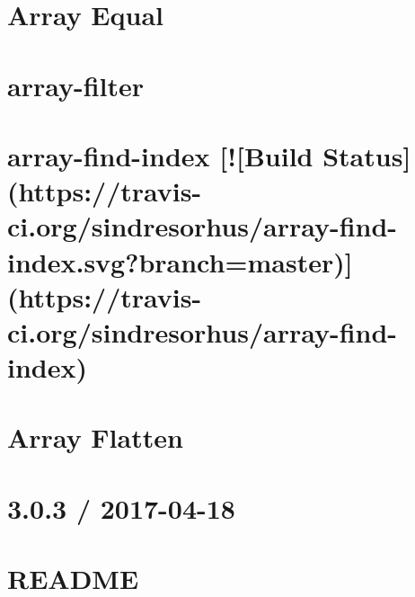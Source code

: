 \documentclass[twoside]{book}
\newcommand{\+}{\discretionary{\mbox{\scriptsize$\hookleftarrow$}}{}{}}
\begin{document}
\chapter{Array Equal}
\label{md__c_1_workspace_demo_src_main_script_node_modules_array-equal__r_e_a_d_m_e}

\chapter{array-\/filter}
\label{md__c_1_workspace_demo_src_main_script_node_modules_array-filter__r_e_a_d_m_e}

\chapter{array-\/find-\/index \mbox{[}!\mbox{[}Build Status\mbox{]}(https\+://travis-\/ci.org/sindresorhus/array-\/find-\/index.svg?branch=master)\mbox{]}(https\+://travis-\/ci.org/sindresorhus/array-\/find-\/index)}
\label{md__c_1_workspace_demo_src_main_script_node_modules_array-find-index_readme}

\chapter{Array Flatten}
\label{md__c_1_workspace_demo_src_main_script_node_modules_array-flatten__r_e_a_d_m_e}

\chapter{3.0.3 / 2017-\/04-\/18}
\label{md__c_1_workspace_demo_src_main_script_node_modules_array-includes__c_h_a_n_g_e_l_o_g}

\chapter{R\+E\+A\+D\+ME}
\label{md__c_1_workspace_demo_src_main_script_node_modules_array-includes__r_e_a_d_m_e}

\end{document}
